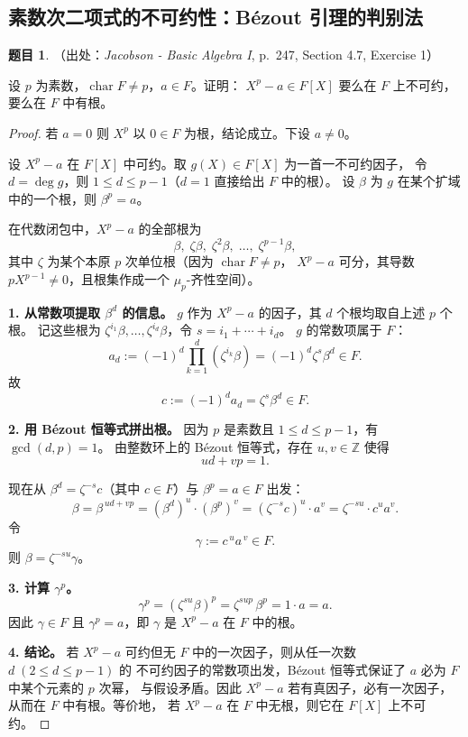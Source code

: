 \documentclass[a4paper]{ctexart}
\theoremstyle{definition}
\newtheorem{example}{题目}[section]
\theoremstyle{analysis}
\theoremstyle{plain}
\begin{document}
\subsection{\texorpdfstring{素数次二项式的不可约性：Bézout 引理的判别法}{素数次二项式的不可约性：Bezout 引理的判别法}}\label{subsec:problem-prime-binomial-irreducible}

\begin{example}
（出处：\textit{Jacobson - Basic Algebra I}, p.~247, Section 4.7, Exercise 1）

设 \(p\) 为素数，\(\operatorname{char}F\neq p\)，\(a\in F\)。证明：
\(X^p-a\in F[X]\) 要么在 \(F\) 上不可约，要么在 \(F\) 中有根。

\begin{proof}
若 \(a=0\) 则 \(X^p\) 以 \(0\in F\) 为根，结论成立。下设 \(a\neq0\)。

设 \(X^p-a\) 在 \(F[X]\) 中可约。取 \(g(X)\in F[X]\) 为一首一不可约因子，
令 \(d=\deg g\)，则 \(1\le d\le p-1\)（\(d=1\) 直接给出 \(F\) 中的根）。
设 \(\beta\) 为 \(g\) 在某个扩域中的一个根，则 \(\beta^p=a\)。

在代数闭包中，\(X^p-a\) 的全部根为
\[
  \beta,\;\zeta\beta,\;\zeta^2\beta,\;\dots,\;\zeta^{p-1}\beta,
\]
其中 \(\zeta\) 为某个本原 \(p\) 次单位根（因为 \(\operatorname{char}F\neq p\)，
\(X^p-a\) 可分，其导数 \(pX^{p-1}\neq0\)，且根集作成一个 \(\mu_p\)-齐性空间）。

\textbf{1. 从常数项提取 \(\beta^d\) 的信息。}
\(g\) 作为 \(X^p-a\) 的因子，其 \(d\) 个根均取自上述 \(p\) 个根。
记这些根为 \(\zeta^{i_1}\beta,\dots,\zeta^{i_d}\beta\)，令 \(s=i_1+\cdots+i_d\)。
\(g\) 的常数项属于 \(F\)：
\[
  a_d:=(-1)^d\prod_{k=1}^d (\zeta^{i_k}\beta)=(-1)^d\zeta^s\beta^d\in F.
\]
故
\[
  c:=(-1)^d a_d=\zeta^s\beta^d\in F.
\]

\textbf{2. 用 Bézout 恒等式拼出根。}
因为 \(p\) 是素数且 \(1\le d\le p-1\)，有 \(\gcd(d,p)=1\)。
由整数环上的 Bézout 恒等式，存在 \(u,v\in\mathbb Z\) 使得
\[
  ud+vp=1.
\]

现在从 \(\beta^d=\zeta^{-s}c\)（其中 \(c\in F\)）与 \(\beta^p=a\in F\) 出发：
\[
  \beta=\beta^{\,ud+vp}=(\beta^d)^u\cdot(\beta^p)^v
  =(\zeta^{-s}c)^u\cdot a^v
  =\zeta^{-su}\cdot c^u a^v.
\]
令
\[
  \gamma:=c^{\,u}a^{\,v}\in F.
\]
则 \(\beta=\zeta^{-su}\gamma\)。

\textbf{3. 计算 \(\gamma^p\)。}
\[
  \gamma^p=(\zeta^{su}\beta)^p
  =\zeta^{sup}\,\beta^p
  =1\cdot a=a.
\]
因此 \(\gamma\in F\) 且 \(\gamma^p=a\)，即 \(\gamma\) 是 \(X^p-a\) 在 \(F\) 中的根。

\textbf{4. 结论。}
若 \(X^p-a\) 可约但无 \(F\) 中的一次因子，则从任一次数 \(d\;(2\le d\le p-1)\) 的
不可约因子的常数项出发，Bézout 恒等式保证了 \(a\) 必为 \(F\) 中某个元素的 \(p\) 次幂，
与假设矛盾。因此 \(X^p-a\) 若有真因子，必有一次因子，从而在 \(F\) 中有根。等价地，
若 \(X^p-a\) 在 \(F\) 中无根，则它在 \(F[X]\) 上不可约。
\end{proof}
\end{example}
\end{document}
